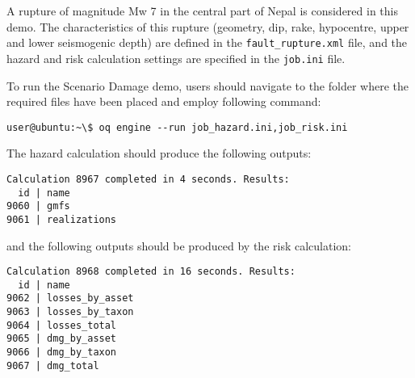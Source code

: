 A rupture of magnitude Mw 7 in the central part of Nepal is considered in this
demo. The characteristics of this rupture (geometry, dip, rake, hypocentre,
upper and lower seismogenic depth) are defined in the \verb+fault_rupture.xml+
file, and the hazard and risk calculation settings are specified in the
\verb+job.ini+ file.

To run the Scenario Damage demo, users should navigate to the folder where the
required files have been placed and employ following command:

\begin{verbatim}
user@ubuntu:~\$ oq engine --run job_hazard.ini,job_risk.ini
\end{verbatim}

The hazard calculation should produce the following outputs:

\begin{verbatim}
Calculation 8967 completed in 4 seconds. Results:
  id | name
9060 | gmfs
9061 | realizations
\end{verbatim}

and the following outputs should be produced by the risk calculation:

\begin{verbatim}
Calculation 8968 completed in 16 seconds. Results:
  id | name
9062 | losses_by_asset
9063 | losses_by_taxon
9064 | losses_total
9065 | dmg_by_asset
9066 | dmg_by_taxon
9067 | dmg_total
\end{verbatim}
